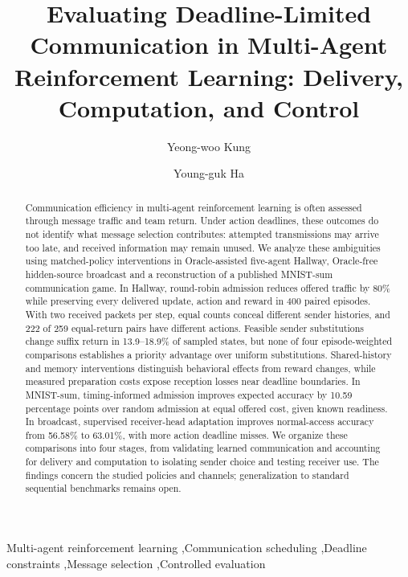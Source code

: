 \documentclass[a4paper,fleqn]{cas-dc}
\begin{document}
\let\WriteBookmarks\relax
{}
\title[mode=title]{Evaluating Deadline-Limited Communication in Multi-Agent Reinforcement Learning: Delivery, Computation, and Control}
\author[1]{Yeong-woo Kung}
\author[1]{Young-guk Ha}
\cormark[1]
\begin{abstract}
Communication efficiency in multi-agent reinforcement learning is often assessed through message traffic and team return. Under action deadlines, these outcomes do not identify what message selection contributes: attempted transmissions may arrive too late, and received information may remain unused. We analyze these ambiguities using matched-policy interventions in Oracle-assisted five-agent Hallway, Oracle-free hidden-source broadcast and a reconstruction of a published MNIST-sum communication game. In Hallway, round-robin admission reduces offered traffic by 80\% while preserving every delivered update, action and reward in 400 paired episodes. With two received packets per step, equal counts conceal different sender histories, and 222 of 259 equal-return pairs have different actions. Feasible sender substitutions change suffix return in 13.9--18.9\% of sampled states, but none of four episode-weighted comparisons establishes a priority advantage over uniform substitutions. Shared-history and memory interventions distinguish behavioral effects from reward changes, while measured preparation costs expose reception losses near deadline boundaries. In MNIST-sum, timing-informed admission improves expected accuracy by 10.59 percentage points over random admission at equal offered cost, given known readiness. In broadcast, supervised receiver-head adaptation improves normal-access accuracy from 56.58\% to 63.01\%, with more action deadline misses. We organize these comparisons into four stages, from validating learned communication and accounting for delivery and computation to isolating sender choice and testing receiver use. The findings concern the studied policies and channels; generalization to standard sequential benchmarks remains open.
\end{abstract}
\begin{keywords}
Multi-agent reinforcement learning \sep Communication scheduling \sep Deadline constraints \sep Message selection \sep Controlled evaluation
\end{keywords}
\renewcommand{\printorcid}{}
\renewcommand{\printemails}{%
  \begingroup
  \let\thefootnote\relax
  \footnotetext{\raggedright
    \begin{tabular}{@{}l@{}}
      \textit{Email addresses:}\\ \texttt{yeongwoo@konkuk.ac.kr} (Y. Kung);\\
      \texttt{ygha@konkuk.ac.kr} (Y. Ha)
    \end{tabular}}%
  \endgroup}
\end{document}
